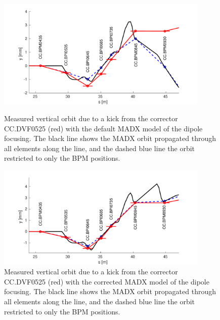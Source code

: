 \begin{figure}
  \centering
  \includegraphics[width=0.9\textwidth]{Figures/optics/modelOrigBendV}
  \caption{Measured vertical orbit due to a kick from the corrector CC.DVF0525 (red) with the default MADX model of the dipole focusing. The black line shows the MADX orbit propagated through all elements along the line, and the dashed blue line the orbit restricted to only the BPM positions.}
  \label{f:modelOrigBendV}
  \includegraphics[width=0.9\textwidth]{Figures/optics/modelCorrBendV}
  \caption{Measured vertical orbit due to a kick from the corrector CC.DVF0525 (red) with the corrected MADX model of the dipole focusing. The black line shows the MADX orbit propagated through all elements along the line, and the dashed blue line the orbit restricted to only the BPM positions.}
  \label{f:modelCorrBendV}
\end{figure}


